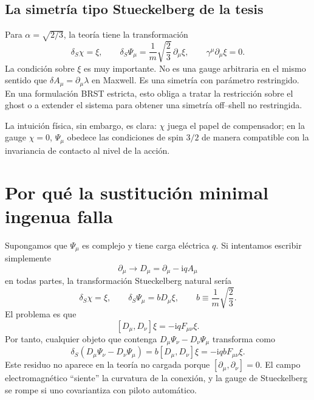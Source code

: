 \documentclass[11pt,a4paper]{article}
\numberwithin{equation}{section}
\newcommand{\sdel}{\gamma^\mu\partial_\mu}
\newcommand{\ii}{\mathrm i}
\begin{document}
\subsection{La simetría tipo Stueckelberg de la tesis}
\label{subsec:la-simetria-tipo-stueckelberg-de-la-tesis}

Para $\alpha=\sqrt{2/3}$, la teoría tiene la transformación
\begin{equation}
\label{eq:tesis-stueckelberg}
\delta_S\chi=\xi,
\qquad
\delta_S\Psi_\mu=\frac{1}{m}\sqrt{\frac23}\,\partial_\mu\xi,
\qquad
\sdel\xi=0.
\end{equation}
La condición sobre $\xi$ es muy importante. No es una gauge arbitraria en el mismo sentido que $\delta A_\mu=\partial_\mu\lambda$ en Maxwell. Es una simetría con parámetro restringido. En una formulación BRST estricta, esto obliga a tratar la restricción sobre el ghost o a extender el sistema para obtener una simetría off--shell no restringida.

La intuición física, sin embargo, es clara: $\chi$ juega el papel de compensador; en la gauge $\chi=0$, $\Psi_\mu$ obedece las condiciones de spin $3/2$ de manera compatible con la invariancia de contacto al nivel de la acción.

\section{Por qué la sustitución minimal ingenua falla}
\label{sec:por-que-la-sustitucion-minimal-ingenua-falla}

Supongamos que $\Psi_\mu$ es complejo y tiene carga eléctrica $q$. Si intentamos escribir simplemente
\begin{equation}
\partial_\mu\longrightarrow D_\mu=\partial_\mu-\ii q A_\mu
\end{equation}
en todas partes, la transformación Stueckelberg natural sería
\begin{equation}
\delta_S\chi=\xi,
\qquad
\delta_S\Psi_\mu=bD_\mu\xi,
\qquad
b\equiv \frac{1}{m}\sqrt{\frac23}.
\end{equation}
El problema es que
\begin{equation}
\label{eq:commutator-D}
[D_\mu,D_\nu]\xi=-\ii q F_{\mu\nu}\xi.
\end{equation}
Por tanto, cualquier objeto que contenga $D_\mu\Psi_\nu-D_\nu\Psi_\mu$ transforma como
\begin{equation}
\delta_S(D_\mu\Psi_\nu-D_\nu\Psi_\mu)
=b[D_\mu,D_\nu]\xi
=-\ii q b F_{\mu\nu}\xi.
\end{equation}
Este residuo no aparece en la teoría no cargada porque $[\partial_\mu,\partial_\nu]=0$. El campo electromagnético ``siente'' la curvatura de la conexión, y la gauge de Stueckelberg se rompe si uno covariantiza con piloto automático.
\end{document}

